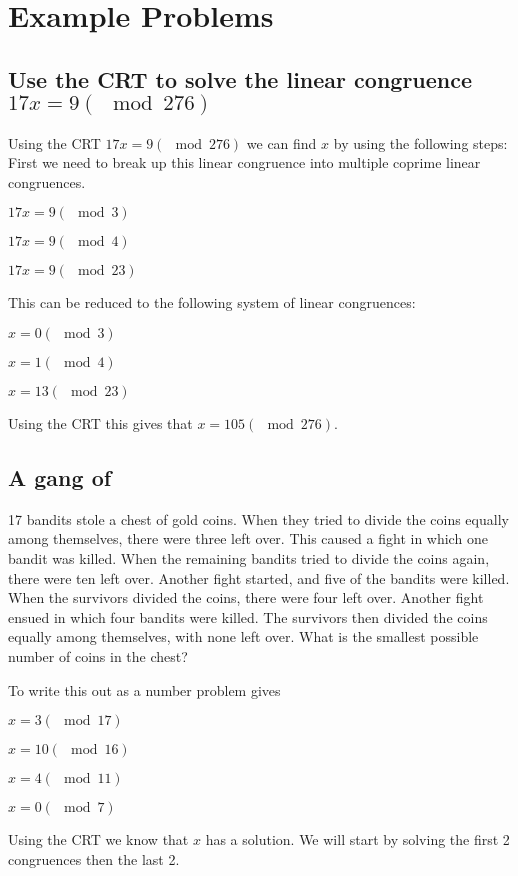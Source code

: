 \documentclass[12pt]{article}
\begin{document}
\section*{Example Problems}

\subsection*{Use the CRT to solve the linear congruence $17x = 9 (\mod 276)$}

Using the CRT $17x = 9 (\mod 276)$ we can find $x$ by using the following steps:
First we need to break up this linear congruence into multiple coprime linear congruences.
\begin{center}
    $17x = 9 (\mod 3)$

    $17x = 9 (\mod 4)$

    $17x = 9 (\mod 23)$
\end{center}
This can be reduced to the following system of linear congruences:
\begin{center}
    $x = 0 (\mod 3)$

    $x = 1 (\mod 4)$

    $x = 13 (\mod 23)$
\end{center}
Using the CRT this gives that $x = 105 (\mod 276)$.

\subsection*{A gang of} 17 bandits stole a chest of gold coins. When they tried
to divide the coins equally among themselves, there were three left over. This caused a fight in
which one bandit was killed. When the remaining bandits tried to divide the coins again, there
were ten left over. Another fight started, and five of the bandits were killed. When the survivors
divided the coins, there were four left over. Another fight ensued in which four bandits were killed.
The survivors then divided the coins equally among themselves, with none left over. What is the
smallest possible number of coins in the chest?

To write this out as a number problem gives

\begin{center}
    $x = 3 (\mod 17)$

    $x = 10 (\mod 16)$

    $x = 4 (\mod 11)$

    $x = 0 (\mod 7)$
\end{center}
Using the CRT we know that $x$ has a solution. We will start by solving the first 2 congruences then the last 2.
\end{document}

